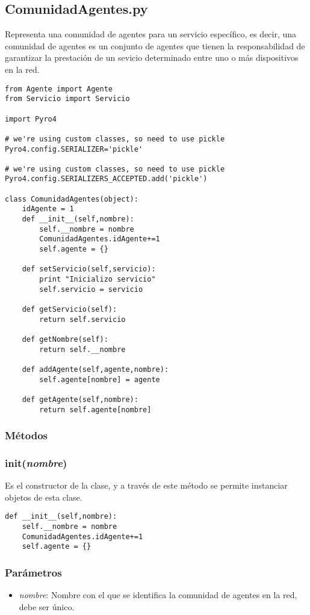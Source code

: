 \documentclass{article}
\begin{document}
\subsection{ComunidadAgentes.py}
Representa una comunidad de agentes para un servicio específico, es decir, una comunidad de agentes es un conjunto de agentes que tienen la responsabilidad de garantizar la prestación de un sevicio determinado entre uno o más dispositivos en la red.
\begin{lstlisting}
from Agente import Agente
from Servicio import Servicio

import Pyro4

# we're using custom classes, so need to use pickle
Pyro4.config.SERIALIZER='pickle'

# we're using custom classes, so need to use pickle
Pyro4.config.SERIALIZERS_ACCEPTED.add('pickle')

class ComunidadAgentes(object):
    idAgente = 1
    def __init__(self,nombre):
        self.__nombre = nombre
        ComunidadAgentes.idAgente+=1
        self.agente = {}
        
    def setServicio(self,servicio):
        print "Inicializo servicio"
        self.servicio = servicio
        
    def getServicio(self):
        return self.servicio
        
    def getNombre(self):
        return self.__nombre
        
    def addAgente(self,agente,nombre):
        self.agente[nombre] = agente
        
    def getAgente(self,nombre):
        return self.agente[nombre]
\end{lstlisting}
\subsubsection*{Métodos}
\subsubsection{\textbf{init}(\textit{nombre})}
Es el constructor de la clase, y a través de este método se permite instanciar objetos de esta clase.
\begin{lstlisting}
def __init__(self,nombre):
	self.__nombre = nombre
	ComunidadAgentes.idAgente+=1
	self.agente = {}
\end{lstlisting}
\subsubsection*{Parámetros}
\begin{itemize}
\item \textit{nombre}: Nombre con el que se identifica la comunidad de agentes en la red, debe ser único.
\end{itemize}
\end{document}
